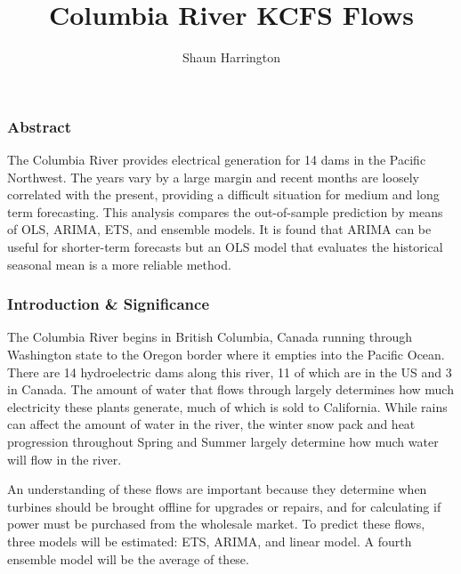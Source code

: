 \documentclass[
  letterpaper,
  DIV=11,
  numbers=noendperiod]{scrartcl}
\title{Columbia River KCFS Flows}
\author{Shaun Harrington}
\date{}
\begin{document}
\maketitle
\ifdefined\Shaded\renewenvironment{Shaded}{\begin{tcolorbox}[borderline west={3pt}{0pt}{shadecolor}, enhanced, boxrule=0pt, sharp corners, frame hidden, interior hidden, breakable]}{\end{tcolorbox}}\fi

\hypertarget{abstract}{%
\subsubsection{Abstract}\label{abstract}}

The Columbia River provides electrical generation for 14 dams in the
Pacific Northwest. The years vary by a large margin and recent months
are loosely correlated with the present, providing a difficult situation
for medium and long term forecasting. This analysis compares the
out-of-sample prediction by means of OLS, ARIMA, ETS, and ensemble
models. It is found that ARIMA can be useful for shorter-term forecasts
but an OLS model that evaluates the historical seasonal mean is a more
reliable method.

\newpage

\hypertarget{introduction-significance}{%
\subsubsection{Introduction \&
Significance}\label{introduction-significance}}

The Columbia River begins in British Columbia, Canada running through
Washington state to the Oregon border where it empties into the Pacific
Ocean. There are 14 hydroelectric dams along this river, 11 of which are
in the US and 3 in Canada. The amount of water that flows through
largely determines how much electricity these plants generate, much of
which is sold to California. While rains can affect the amount of water
in the river, the winter snow pack and heat progression throughout
Spring and Summer largely determine how much water will flow in the
river.

An understanding of these flows are important because they determine
when turbines should be brought offline for upgrades or repairs, and for
calculating if power must be purchased from the wholesale market. To
predict these flows, three models will be estimated: ETS, ARIMA, and
linear model. A fourth ensemble model will be the average of these.
\end{document}
